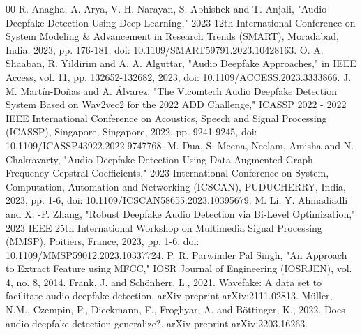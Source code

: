 \documentclass[conference]{IEEEtran}
\begin{document}
\begin{thebibliography}{00}
  R. Anagha, A. Arya, V. H. Narayan, S. Abhishek and T. Anjali, "Audio Deepfake Detection Using Deep Learning," 2023 12th International Conference on System Modeling \& Advancement in Research Trends (SMART), Moradabad, India, 2023, pp. 176-181, doi: 10.1109/SMART59791.2023.10428163.
 O. A. Shaaban, R. Yildirim and A. A. Alguttar, "Audio Deepfake Approaches," in IEEE Access, vol. 11, pp. 132652-132682, 2023, doi: 10.1109/ACCESS.2023.3333866.
 J. M. Martín-Doñas and A. Álvarez, "The Vicomtech Audio Deepfake Detection System Based on Wav2vec2 for the 2022 ADD Challenge," ICASSP 2022 - 2022 IEEE International Conference on Acoustics, Speech and Signal Processing (ICASSP), Singapore, Singapore, 2022, pp. 9241-9245, doi: 10.1109/ICASSP43922.2022.9747768.
 M. Dua, S. Meena, Neelam, Amisha and N. Chakravarty, "Audio Deepfake Detection Using Data Augmented Graph Frequency Cepstral Coefficients," 2023 International Conference on System, Computation, Automation and Networking (ICSCAN), PUDUCHERRY, India, 2023, pp. 1-6, doi: 10.1109/ICSCAN58655.2023.10395679.
 M. Li, Y. Ahmadiadli and X. -P. Zhang, "Robust Deepfake Audio Detection via Bi-Level Optimization," 2023 IEEE 25th International Workshop on Multimedia Signal Processing (MMSP), Poitiers, France, 2023, pp. 1-6, doi: 10.1109/MMSP59012.2023.10337724.
 P. R. Parwinder Pal Singh, "An Approach to Extract Feature using MFCC," IOSR Journal of Engineering (IOSRJEN), vol. 4, no. 8, 2014. 
Frank, J. and Schönherr, L., 2021. Wavefake: A data set to facilitate audio deepfake detection. arXiv preprint arXiv:2111.02813.
 Müller, N.M., Czempin, P., Dieckmann, F., Froghyar, A. and Böttinger, K., 2022. Does audio deepfake detection generalize?. arXiv preprint arXiv:2203.16263.
\end{thebibliography}
\end{document}
